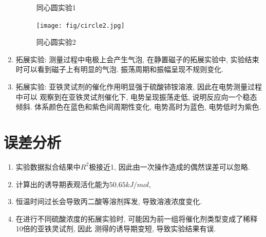 \documentclass[a4paper]{article}
\begin{document}
\begin{enumerate}
\begin{figure}[!h]
		\caption{同心圆实验1}
	\end{figure}
	\begin{figure}[!h]
		\centering
		\texttt{[image: fig/circle2.jpg]}\\
		\caption{同心圆实验2}
	\end{figure}
	\item 拓展实验: 测量过程中电极上会产生气泡, 在静置磁子的拓展实验中,
	实验结束时可以看到磁子上有明显的气泡. 振荡周期和振幅呈现不规则变化.
	\item 拓展实验: 亚铁灵试剂的催化作用明显强于硫酸铈铵溶液, 因此在电势测量过程中可以
	观察到在亚铁灵试剂催化下, 电势呈现振荡走低, 说明反应向一个稳态倾斜. 
	体系颜色在蓝色和紫色间周期性变化, 电势高时为蓝色, 
	电势低时为紫色. 


\end{enumerate}
\section{误差分析}
\begin{enumerate}
	\item 实验数据拟合结果中$R^{2}$极接近1, 
	因此由一次操作造成的偶然误差可以忽略. 
	\item 计算出的诱导期表观活化能为$50.65 kJ/mol$,
	\item 恒温时间过长会导致丙二酸等溶剂挥发, 导致溶液浓度变化.
	\item 在进行不同硫酸浓度的拓展实验时, 
	可能因为前一组将催化剂类型变成了稀释10倍的亚铁灵试剂, 因此
	测得的诱导期变短, 导致实验结果有误.
\end{enumerate}
\newpage
\end{document}
